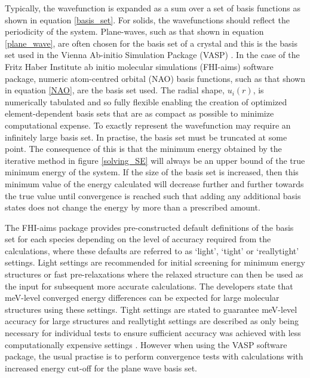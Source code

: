 Typically, the wavefunction is expanded as a sum over a set of basis functions as shown in equation \ref{basis_set}.
For solids, the wavefunctions should reflect the periodicity of the system. Plane-waves, such as that shown in equation \ref{plane_wave}, are often chosen for the basis set of a crystal and this is the basis set used in the Vienna Ab-initio Simulation Package (VASP) \cite{VASP}. In the case of the Fritz Haber Institute ab initio molecular simulations (FHI-aims) software package, numeric atom-centred orbital (NAO) basis functions, such as that shown in equation \ref{NAO}, are the basis set used. The radial shape, $u_i(r)$, is numerically tabulated and so fully flexible enabling the creation of optimized element-dependent basis sets that are as compact as possible to minimize computational expense. 
To exactly represent the wavefunction may require an infinitely large basis set. In practise, the basis set must be truncated at some point. The consequence of this is that the minimum energy obtained by the iterative method in figure \ref{solving_SE} will always be an upper bound of the true minimum energy of the system. If the size of the basis set is increased, then this minimum value of the energy calculated will decrease further and further towards the true value until convergence is reached such that adding any additional basis states does not change the energy by more than a prescribed amount. 

The FHI-aims package provides pre-constructed default definitions of the basis set for each species depending on the level of accuracy required from the calculations, where these defaults are referred to as `light', `tight' or `really{\textunderscore}tight' settings. Light settings are recommended for initial screening for minimum energy structures or fast pre-relaxations where the relaxed structure can then be used as the input for subsequent more accurate calculations. The developers state that meV-level converged energy differences can be expected for large molecular structures using these settings. Tight settings are stated to guarantee meV-level accuracy for large structures and really{\textunderscore}tight settings are described as only being necessary for individual tests to ensure sufficient accuracy was achieved with less computationally expensive settings \cite{aims}. However when using the VASP software package, the usual practise is to perform convergence tests with calculations with increased energy cut-off for the plane wave basis set.

